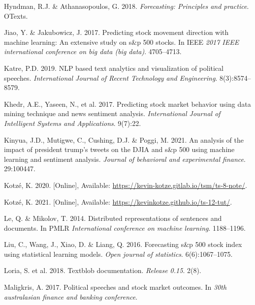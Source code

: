 \documentclass[11pt,preprint, authoryear]{elsarticle}
\numberwithin{equation}{section}
\numberwithin{figure}{section}
\numberwithin{table}{section}
\newlength{\cslhangindent}
\newenvironment{CSLReferences}%
  {\setlength{\parindent}{0pt}%
  \everypar{\setlength{\hangindent}{\cslhangindent}}\ignorespaces}%
  {\par}
\begin{document}
\begin{CSLReferences}{1}{0}
\leavevmode{}%
Hyndman, R.J. \& Athanasopoulos, G. 2018. \emph{Forecasting: Principles
and practice}. OTexts.

\leavevmode{}%
Jiao, Y. \& Jakubowicz, J. 2017. Predicting stock movement direction
with machine learning: An extensive study on s\&p 500 stocks. In IEEE
\emph{2017 IEEE international conference on big data (big data)}.
4705--4713.

\leavevmode{}%
Katre, P.D. 2019. NLP based text analytics and visualization of
political speeches. \emph{International Journal of Recent Technology and
Engineering}. 8(3):8574--8579.

\leavevmode{}%
Khedr, A.E., Yaseen, N., et al. 2017. Predicting stock market behavior
using data mining technique and news sentiment analysis.
\emph{International Journal of Intelligent Systems and Applications}.
9(7):22.

\leavevmode{}%
Kinyua, J.D., Mutigwe, C., Cushing, D.J. \& Poggi, M. 2021. An analysis
of the impact of president trump's tweets on the DJIA and s\&p 500 using
machine learning and sentiment analysis. \emph{Journal of behavioral and
experimental finance}. 29:100447.

\leavevmode{}%
Kotzé, K. 2020. {[}Online{]}, Available:
\url{https://kevin-kotze.gitlab.io/tsm/ts-8-note/}.

\leavevmode{}%
Kotzé, K. 2021. {[}Online{]}, Available:
\url{https://kevinkotze.github.io/ts-12-tut/}.

\leavevmode{}%
Le, Q. \& Mikolov, T. 2014. Distributed representations of sentences and
documents. In PMLR \emph{International conference on machine learning}.
1188--1196.

\leavevmode{}%
Liu, C., Wang, J., Xiao, D. \& Liang, Q. 2016. Forecasting s\&p 500
stock index using statistical learning models. \emph{Open journal of
statistics}. 6(6):1067--1075.

\leavevmode{}%
Loria, S. et al. 2018. Textblob documentation. \emph{Release 0.15}.
2(8).

\leavevmode{}%
Maligkris, A. 2017. Political speeches and stock market outcomes. In
\emph{30th australasian finance and banking conference}.


\end{CSLReferences}
\end{document}
